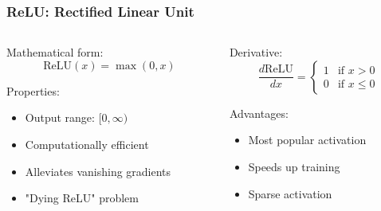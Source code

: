 \documentclass{beamer}
\begin{document}
\begin{frame}
\frametitle{ReLU: Rectified Linear Unit}
\begin{columns}
\begin{column}{0.5\textwidth}
Mathematical form:
\begin{equation}
\text{ReLU}(x) = \max(0, x)
\end{equation}

Properties:
\begin{itemize}
    \item Output range: $[0, \infty)$
    \item Computationally efficient
    \item Alleviates vanishing gradients
    \item "Dying ReLU" problem
\end{itemize}
\end{column}
\begin{column}{0.5\textwidth}
Derivative:
\begin{equation}
\frac{d\text{ReLU}}{dx} = \begin{cases} 
1 & \text{if } x > 0 \\
0 & \text{if } x \leq 0
\end{cases}
\end{equation}

Advantages:
\begin{itemize}
    \item Most popular activation
    \item Speeds up training
    \item Sparse activation
\end{itemize}
\end{column}
\end{columns}
\end{frame}
\end{document}
